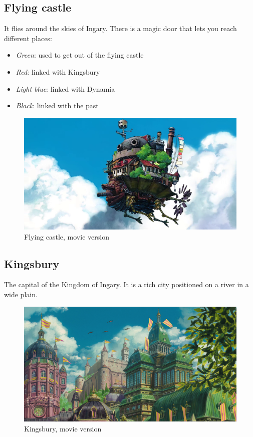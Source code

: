 \subsection{Flying castle}
	It flies around the skies of Ingary. There is a magic door that lets you reach different places:
	\begin{itemize}
		\item \textit{Green}: used to get out of the flying castle
		\item \textit{Red}: linked with Kingsbury
		\item \textit{Light blue}: linked with Dynamia
		\item \textit{Black}: linked with the past
	\end{itemize}
	\begin{figure}[H]
	  \centering
	  \includegraphics[width=12cm]{../Images/Locations/flyingCastle}
	  \caption{Flying castle, movie version}
	\end{figure}
	
\subsection{Kingsbury}
	The capital of the Kingdom of Ingary. It is a rich city positioned on a river in a wide plain.
	\begin{figure}[H]
	  \centering
	  \includegraphics[width=12cm]{../Images/Locations/kingsbury}
	  \caption{Kingsbury, movie version}
	\end{figure}

